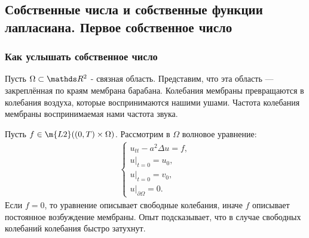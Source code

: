 \subsection{Собственные числа и собственные функции лапласиана. Первое собственное число}
\subsubsection*{Как услышать собственное число}
Пусть $\Omega \subset \real^2$ - связная область. Представим, что эта область --- закреплённая по краям мембрана барабана. Колебания мембраны превращаются в колебания воздуха, которые воспринимаются нашими ушами. Частота колебания мембраны  воспринимаемая нами частота звука.

Пусть $f \in \m{L2}((0,T) \times \Omega)$. Рассмотрим в $\Omega$ волновое уравнение:
\begin{align*}
	\begin{cases*}
		u_{tt} - a^2 \Delta u = f,\\
		u \big\rvert_{t=0} = u_0,\\
		u \big\rvert_{t=0} = v_0,\\
		u \big\rvert_{\partial \Omega} = 0.
	\end{cases*}
\end{align*}
Если $f = 0$, то уравнение описывает свободные колебания, иначе $f$ описывает постоянное возбуждение мембраны. Опыт подсказывает, что в случае свободных колебаний колебания быстро затухнут.

